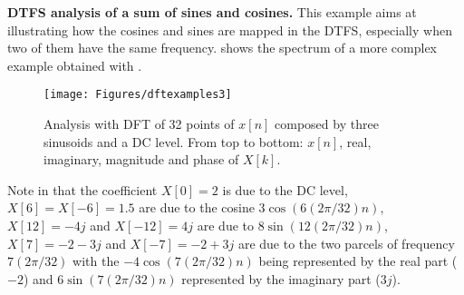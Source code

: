 
\bApplication \textbf{DTFS analysis of a sum of sines and cosines.}
This example aims at illustrating how the cosines and sines are mapped in the DTFS, especially when two of them have the same frequency.  shows the spectrum of a more complex example obtained with .

\begin{figure}[!htb]
        \centering
                \texttt{[image: Figures/dftexamples3]}        
        \caption[{Analysis with DFT of 32 points of $x[n]$ composed by three sinusoids and a DC level.}]{Analysis with DFT of 32 points of $x[n]$ composed by three sinusoids and a DC level. From top to bottom: $x[n]$, real, imaginary, magnitude and phase of $X[k]$.\label{fig:dftexamples3}}
\end{figure}

Note in  that the coefficient $X[0]=2$ is due to the DC level, $X[6]=X[-6]=1.5$ are due to the cosine $3 \cos(6 (2 \pi/ 32) n)$, $X[12]=-4j$ and $X[-12]=4j$ are due to $8 \sin(12 (2 \pi/ 32) n)$, $X[7]=-2-3j$ and $X[-7]=-2+3j$ are due to the two parcels of frequency $7 (2\pi/32)$ with the $-4\cos(7 (2 \pi/ 32) n)$ being represented by the real part ($-2$) and $6 \sin(7 (2 \pi/ 32) n)$ represented by the imaginary part ($3j$).
\eApplication

